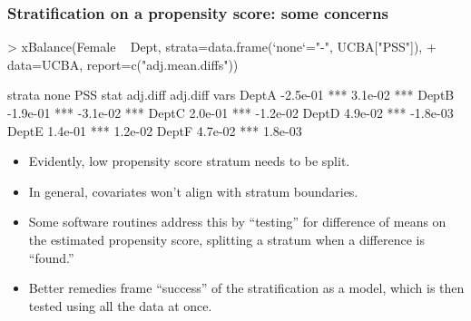 \begin{frame}
  \frametitle{Stratification on a propensity score: some concerns}
\begin{Schunk}
\begin{Sinput}
> xBalance(Female ~ Dept, strata=data.frame(`none`="-", UCBA["PSS"]), 
+ data=UCBA, report=c("adj.mean.diffs"))
\end{Sinput}
\begin{Soutput}
      strata     none               PSS         
      stat   adj.diff          adj.diff         
vars                                            
DeptA        -2.5e-01 ***      3.1e-02  ***     
DeptB        -1.9e-01 ***      -3.1e-02 ***     
DeptC        2.0e-01  ***      -1.2e-02         
DeptD        4.9e-02  ***      -1.8e-03         
DeptE        1.4e-01  ***      1.2e-02          
DeptF        4.7e-02  ***      1.8e-03          
\end{Soutput}
\end{Schunk}
  \begin{itemize}[<+-| alert@+>]
  \item 
  Evidently, low propensity score stratum needs to be split.
\item In general, covariates won't align with stratum boundaries.
  \item Some software routines address this by ``testing'' for difference of means on the estimated propensity score, splitting a stratum when a difference is ``found.''
  \item Better remedies frame ``success'' of the stratification as a
    model, which is then tested using all the data at once.
\end{itemize}
\end{frame}


\nocite{hansen:klopfer:2006,rosenbaum:2002}



